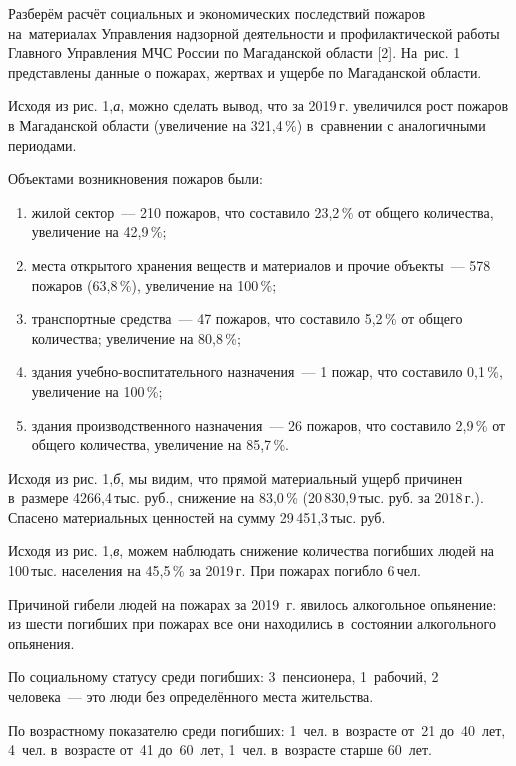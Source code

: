  Разберём расчёт социальных и экономических последствий пожаров на~материалах Управления надзорной деятельности и профилактической работы Главного Управления МЧС России по Магаданской области [2]. На~рис. 1 представлены данные о пожарах, жертвах и ущербе по Магаданской области.



Исходя из рис. 1,\textit{а}, можно сделать вывод, что за 2019\,г. увеличился рост пожаров в Магаданской области (увеличение на 321,4\,\%) в~сравнении с аналогичными периодами.

Объектами возникновения пожаров были:
\begin{enumerate}[noitemsep]\vspace{-8pt}
\item жилой сектор~--- 210 пожаров, что составило 23,2\,\% от общего количества, увеличение на 42,9\,\%;
\item места открытого хранения веществ и материалов и прочие объекты~--- 578 пожаров (63,8\,\%), увеличение на 100\,\%;
\item транспортные средства~--- 47 пожаров, что составило 5,2\,\% от общего количества; увеличение на 80,8\,\%;
\item здания учебно-воспитательного назначения~--- 1 пожар, что составило 0,1\,\%, увеличение на 100\,\%;
\item здания производственного назначения~--- 26 пожаров, что составило 2,9\,\% от общего количества, увеличение на 85,7\,\%.
\end{enumerate}
 \vspace{-8pt}

 Исходя из рис. 1,\textit{б}, мы видим, что прямой материальный ущерб причинен в~размере 4266,4\,тыс. руб., снижение на 83,0\,\% (20\,830,9\,тыс. руб. за 2018\,г.). Спасено материальных ценностей на сумму 29\,451,3\,тыс. руб.

 Исходя из рис. 1,\textit{в}, можем наблюдать снижение количества погибших людей на 100\,тыс. населения на 45,5\,\% за 2019\,г. При пожарах погибло 6\,чел.

 Причиной гибели людей на пожарах за 2019~г. явилось алкогольное
 опьянение: из шести погибших при пожарах все они находились в~состоянии алкогольного опьянения.

 По социальному статусу среди погибших: 3~пенсионера, 1~рабочий, 2 человека~--- это люди без определённого места жительства.

 По возрастному показателю среди погибших: 1~чел. в~возрасте от~21
 до~40~лет, 4~чел. в~возрасте от~41 до~60~лет, 1~чел. в~возрасте старше 60~лет.

